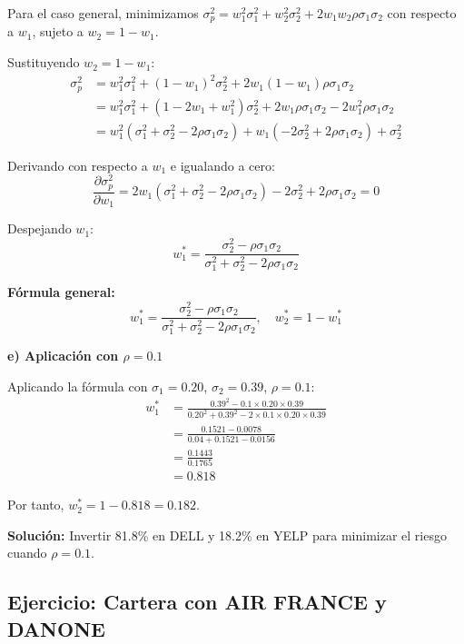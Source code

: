 \begin{ejemplo}
Para el caso general, minimizamos $\sigma_p^2 = w_1^2 \sigma_1^2 + w_2^2 \sigma_2^2 + 2w_1 w_2 \rho \sigma_1 \sigma_2$ con respecto a $w_1$, sujeto a $w_2 = 1 - w_1$.

Sustituyendo $w_2 = 1 - w_1$:
\begin{align*}
\sigma_p^2 &= w_1^2 \sigma_1^2 + (1-w_1)^2 \sigma_2^2 + 2w_1(1-w_1)\rho \sigma_1 \sigma_2 \\
&= w_1^2 \sigma_1^2 + (1 - 2w_1 + w_1^2)\sigma_2^2 + 2w_1\rho \sigma_1 \sigma_2 - 2w_1^2\rho \sigma_1 \sigma_2 \\
&= w_1^2(\sigma_1^2 + \sigma_2^2 - 2\rho \sigma_1 \sigma_2) + w_1(-2\sigma_2^2 + 2\rho \sigma_1 \sigma_2) + \sigma_2^2
\end{align*}

Derivando con respecto a $w_1$ e igualando a cero:
$$\frac{\partial \sigma_p^2}{\partial w_1} = 2w_1(\sigma_1^2 + \sigma_2^2 - 2\rho \sigma_1 \sigma_2) - 2\sigma_2^2 + 2\rho \sigma_1 \sigma_2 = 0$$

Despejando $w_1$:
$$w_1^* = \frac{\sigma_2^2 - \rho \sigma_1 \sigma_2}{\sigma_1^2 + \sigma_2^2 - 2\rho \sigma_1 \sigma_2}$$

\textbf{Fórmula general:}
$$w_1^* = \frac{\sigma_2^2 - \rho \sigma_1 \sigma_2}{\sigma_1^2 + \sigma_2^2 - 2\rho \sigma_1 \sigma_2}, \quad w_2^* = 1 - w_1^*$$

\textbf{e) Aplicación con $\rho = 0.1$}

Aplicando la fórmula con $\sigma_1 = 0.20$, $\sigma_2 = 0.39$, $\rho = 0.1$:
\begin{align*}
w_1^* &= \frac{0.39^2 - 0.1 \times 0.20 \times 0.39}{0.20^2 + 0.39^2 - 2 \times 0.1 \times 0.20 \times 0.39} \\
&= \frac{0.1521 - 0.0078}{0.04 + 0.1521 - 0.0156} \\
&= \frac{0.1443}{0.1765} \\
&= 0.818
\end{align*}

Por tanto, $w_2^* = 1 - 0.818 = 0.182$.

\textbf{Solución:} Invertir 81.8\% en DELL y 18.2\% en YELP para minimizar el riesgo cuando $\rho = 0.1$.
\end{ejemplo}

\subsection{Ejercicio: Cartera con AIR FRANCE y DANONE}

